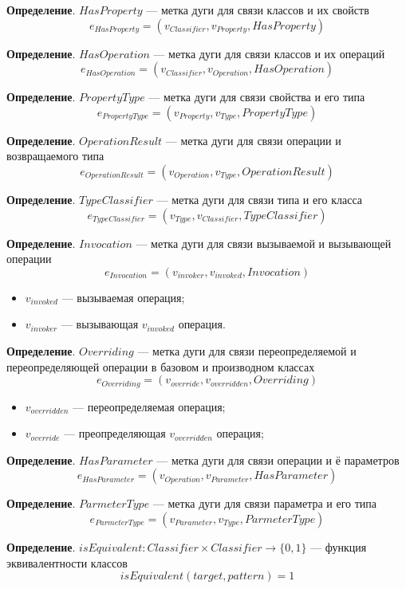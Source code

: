 \textbf{Определение}. $HasProperty$ --- метка дуги для связи классов и их свойств
%
$$e_{HasProperty} = (v_{Classifier}, v_{Property}, HasProperty)$$

\textbf{Определение}. $HasOperation$ --- метка дуги для связи классов и их операций
%
$$e_{HasOperation} = (v_{Classifier}, v_{Operation}, HasOperation)$$

\textbf{Определение}. $PropertyType$ --- метка дуги для связи свойства и его типа
%
$$e_{PropertyType} = (v_{Property}, v_{Type}, PropertyType)$$

\textbf{Определение}. $OperationResult$ --- метка дуги для связи операции и возвращаемого типа
%
$$e_{OperationResult} = (v_{Operation}, v_{Type}, OperationResult)$$

\textbf{Определение}. $TypeClassifier$ --- метка дуги для связи типа и его класса
%
$$e_{TypeClassifier} = (v_{Type}, v_{Classifier}, TypeClassifier)$$

\textbf{Определение}. $Invocation$ --- метка дуги для связи вызываемой и вызывающей операции
%
$$e_{Invocation} = (v_{invoker}, v_{invoked}, Invocation)$$
%
\begin{itemize}
\item $v_{invoked}$ --- вызываемая операция;
\item $v_{invoker}$ --- вызывающая $v_{invoked}$ операция.
\end{itemize}

\textbf{Определение}. $Overriding$ --- метка дуги для связи
переопределяемой и переопределяющей операции в базовом и производном классах
%
$$e_{Overriding} = (v_{override}, v_{overridden}, Overriding)$$

\begin{itemize}
\item $v_{overridden}$ --- переопределяемая операция;
\item $v_{override}$ --- преопределяющая $v_{overridden}$ операция;
\end{itemize}

\textbf{Определение}. $HasParameter$ --- метка дуги для связи операции и ё параметров
%
$$e_{HasParameter} = (v_{Operation}, v_{Parameter}, HasParameter)$$

\textbf{Определение}. $ParmeterType$ --- метка дуги для связи параметра и его типа
%
$$e_{ParmeterType} = (v_{Parameter}, v_{Type}, ParmeterType)$$

\textbf{Определение}. $isEquivalent: Classifier \times Classifier \to \{ 0, 1 \}$
--- функция эквивалентности классов
%
$$isEquivalent(target, pattern) = 1$$

